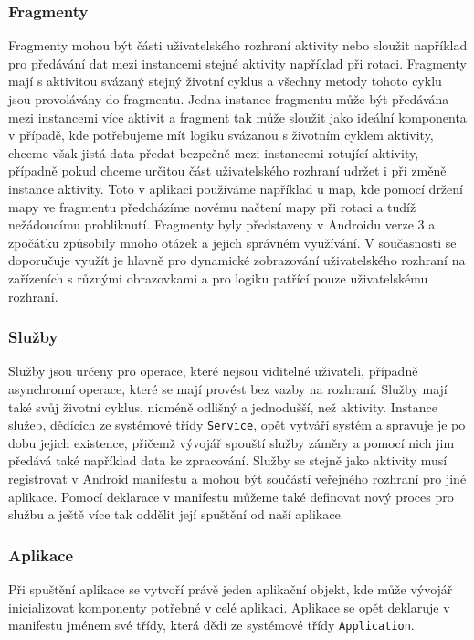 \documentclass[czech,master,public,dept460,male,java,cpdeclaration]{diploma}
\begin{document}
\subsubsection{Fragmenty}
Fragmenty mohou být části uživatelského rozhraní aktivity nebo sloužit například pro předávání
dat mezi instancemi stejné aktivity například při rotaci. Fragmenty mají s aktivitou svázaný stejný životní cyklus
a všechny metody tohoto cyklu jsou provolávány do fragmentu. Jedna instance fragmentu
může být předávána mezi instancemi více aktivit a fragment tak může sloužit jako ideální komponenta
v případě, kde potřebujeme mít logiku svázanou s životním cyklem aktivity, chceme však jistá data
předat bezpečně mezi instancemi rotující aktivity, případně pokud chceme určitou část uživatelského
rozhraní udržet i při změně instance aktivity. Toto v aplikaci používáme například u map, kde pomocí
držení mapy ve fragmentu předcházíme novému načtení mapy při rotaci a tudíž nežádoucímu probliknutí.
Fragmenty byly představeny v Androidu verze 3 a zpočátku způsobily mnoho otázek a jejich správném využívání.
V současnosti se doporučuje využít je hlavně pro dynamické zobrazování uživatelského rozhraní na
zařízeních s různými obrazovkami\cite{androiddevelopers} a pro logiku patřící pouze uživatelskému rozhraní.

\subsubsection{Služby}
Služby jsou určeny pro operace, které nejsou viditelné uživateli, případně asynchronní operace, které se mají
provést bez vazby na rozhraní. Služby mají také svůj životní cyklus, nicméně odlišný a jednodušší,
než aktivity. Instance služeb, dědících ze systémové třídy \texttt{Service}, opět vytváří
systém a spravuje je po dobu jejich existence,
přičemž vývojář spouští služby záměry a pomocí nich jim předává také například data ke zpracování.
Služby se stejně jako aktivity musí registrovat v Android manifestu a mohou být součástí veřejného
rozhraní pro jiné aplikace. Pomocí deklarace v manifestu můžeme také definovat nový proces pro službu
a ještě více tak oddělit její spuštění od naší aplikace.

\subsubsection{Aplikace}
Při spuštění aplikace se vytvoří právě jeden aplikační objekt, kde může vývojář inicializovat
komponenty potřebné v celé aplikaci. Aplikace se opět deklaruje v manifestu jménem své třídy, která
dědí ze systémové třídy \texttt{Application}.
\end{document}
